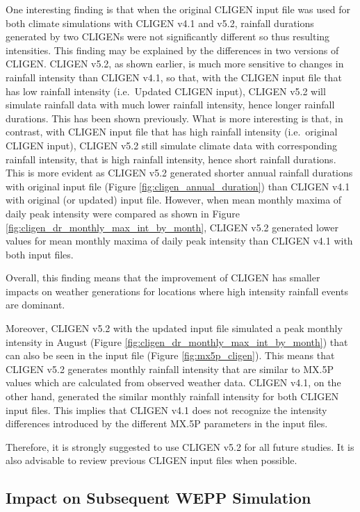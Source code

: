 One interesting finding is that when the original CLIGEN input file was used for
both climate simulations with CLIGEN v4.1 and v5.2, rainfall durations generated
by two CLIGENs were not significantly different so thus resulting intensities.
This finding may be explained by the differences in two versions of CLIGEN.
CLIGEN v5.2, as shown earlier, is much more sensitive to changes in rainfall
intensity than CLIGEN v4.1, so that, with the CLIGEN input file that has
low rainfall intensity (i.e.\ Updated CLIGEN input), CLIGEN v5.2 will
simulate rainfall data with much lower rainfall intensity, hence longer rainfall
durations. This has been shown previously. What is more interesting is that,
in contrast, with CLIGEN input file that has high rainfall intensity
(i.e.\ original CLIGEN input), CLIGEN v5.2 still simulate climate data
with corresponding rainfall intensity, that is high rainfall intensity, hence
short rainfall durations. This is more evident as CLIGEN v5.2 generated
shorter annual rainfall durations with original input file (Figure
\ref{fig:cligen_annual_duration}) than CLIGEN v4.1 with original (or
updated) input file. However, when mean monthly maxima of daily peak intensity
were compared as shown in Figure \ref{fig:cligen_dr_monthly_max_int_by_month},
CLIGEN v5.2 generated lower values for mean monthly maxima of daily peak
intensity than CLIGEN v4.1 with both input files.

Overall, this finding means that the improvement of CLIGEN has smaller impacts
on weather generations for locations where high intensity rainfall events are
dominant.

Moreover, CLIGEN v5.2 with the updated input file simulated a peak monthly
intensity in August (Figure \ref{fig:cligen_dr_monthly_max_int_by_month}) that
can also be seen in the input file (Figure \ref{fig:mx5p_cligen}). This means
that CLIGEN v5.2 generates monthly rainfall intensity that are similar
to {MX.5P} values which are calculated from observed weather data. CLIGEN v4.1,
on the other hand, generated the similar monthly rainfall intensity for both
CLIGEN input files. This implies that CLIGEN v4.1 does not recognize the
intensity differences introduced by the different {MX.5P} parameters in the
input files.

Therefore, it is strongly suggested to use CLIGEN v5.2 for all future
studies. It is also advisable to review previous CLIGEN input files when
possible.

\subsection{Impact on Subsequent WEPP Simulation}

